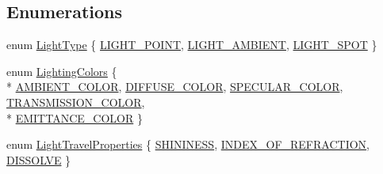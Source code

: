 \subsection*{Enumerations}
\begin{DoxyCompactItemize}
\item 
enum \hyperlink{namespace_g_g_e_abf6b28d5fd20f356a5ad88fec0789eff}{Light\+Type} \{ \hyperlink{namespace_g_g_e_abf6b28d5fd20f356a5ad88fec0789effa10682e47f2dadd21bc173c5563132707}{L\+I\+G\+H\+T\+\_\+\+P\+O\+I\+N\+T}, 
\hyperlink{namespace_g_g_e_abf6b28d5fd20f356a5ad88fec0789effa6e91747b8f895b2df6e810582d808cf2}{L\+I\+G\+H\+T\+\_\+\+A\+M\+B\+I\+E\+N\+T}, 
\hyperlink{namespace_g_g_e_abf6b28d5fd20f356a5ad88fec0789effa6a6aca641e9a8de1341e8c9826e28c3e}{L\+I\+G\+H\+T\+\_\+\+S\+P\+O\+T}
 \}
\item 
enum \hyperlink{namespace_g_g_e_ad1102da762de1f99e787ff6a9453ef73}{Lighting\+Colors} \{ \\*
\hyperlink{namespace_g_g_e_ad1102da762de1f99e787ff6a9453ef73a0e2b52fdda401f9c5e7adcf88e551051}{A\+M\+B\+I\+E\+N\+T\+\_\+\+C\+O\+L\+O\+R}, 
\hyperlink{namespace_g_g_e_ad1102da762de1f99e787ff6a9453ef73a1adb8b6b5f332801c5123c8085fdf330}{D\+I\+F\+F\+U\+S\+E\+\_\+\+C\+O\+L\+O\+R}, 
\hyperlink{namespace_g_g_e_ad1102da762de1f99e787ff6a9453ef73a988671a427177535c02bb476971bc99e}{S\+P\+E\+C\+U\+L\+A\+R\+\_\+\+C\+O\+L\+O\+R}, 
\hyperlink{namespace_g_g_e_ad1102da762de1f99e787ff6a9453ef73a5abf49a870da850605260bd1c8c75f78}{T\+R\+A\+N\+S\+M\+I\+S\+S\+I\+O\+N\+\_\+\+C\+O\+L\+O\+R}, 
\\*
\hyperlink{namespace_g_g_e_ad1102da762de1f99e787ff6a9453ef73ab4b3d5a51b4207d7e0a70d169ff31913}{E\+M\+I\+T\+T\+A\+N\+C\+E\+\_\+\+C\+O\+L\+O\+R}
 \}
\item 
enum \hyperlink{namespace_g_g_e_aa6c57ddad718cba85e6cbd1437b81405}{Light\+Travel\+Properties} \{ \hyperlink{namespace_g_g_e_aa6c57ddad718cba85e6cbd1437b81405aab01896fe3a7559065fa6a6d1a4300cd}{S\+H\+I\+N\+I\+N\+E\+S\+S}, 
\hyperlink{namespace_g_g_e_aa6c57ddad718cba85e6cbd1437b81405a26a173b3290d0b73d8284247b340772a}{I\+N\+D\+E\+X\+\_\+\+O\+F\+\_\+\+R\+E\+F\+R\+A\+C\+T\+I\+O\+N}, 
\hyperlink{namespace_g_g_e_aa6c57ddad718cba85e6cbd1437b81405a0da0949a9e51b4fc3d41b4cea9f8d246}{D\+I\+S\+S\+O\+L\+V\+E}
 \}
\end{DoxyCompactItemize}


